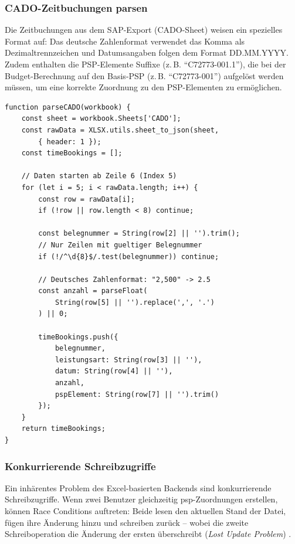 \subsubsection{CADO-Zeitbuchungen parsen}

Die Zeitbuchungen aus dem SAP-Export (CADO-Sheet) weisen ein spezielles Format auf: Das deutsche Zahlenformat verwendet das Komma als Dezimaltrennzeichen und Datumsangaben folgen dem Format DD.MM.YYYY. Zudem enthalten die PSP-Elemente Suffixe (z.\,B. \enquote{C72773-001.1}), die bei der Budget-Berechnung auf den Basis-PSP (z.\,B. \enquote{C72773-001}) aufgelöst werden müssen, um eine korrekte Zuordnung zu den PSP-Elementen zu ermöglichen.

\begin{lstlisting}[caption={Parsing der CADO-Zeitbuchungen}, label={lst:cado-parse}]
function parseCADO(workbook) {
    const sheet = workbook.Sheets['CADO'];
    const rawData = XLSX.utils.sheet_to_json(sheet,
        { header: 1 });
    const timeBookings = [];

    // Daten starten ab Zeile 6 (Index 5)
    for (let i = 5; i < rawData.length; i++) {
        const row = rawData[i];
        if (!row || row.length < 8) continue;

        const belegnummer = String(row[2] || '').trim();
        // Nur Zeilen mit gueltiger Belegnummer
        if (!/^\d{8}$/.test(belegnummer)) continue;

        // Deutsches Zahlenformat: "2,500" -> 2.5
        const anzahl = parseFloat(
            String(row[5] || '').replace(',', '.')
        ) || 0;

        timeBookings.push({
            belegnummer,
            leistungsart: String(row[3] || ''),
            datum: String(row[4] || ''),
            anzahl,
            pspElement: String(row[7] || '').trim()
        });
    }
    return timeBookings;
}
\end{lstlisting}

\subsubsection{Konkurrierende Schreibzugriffe}

Ein inhärentes Problem des Excel-basierten Backends sind konkurrierende Schreibzugriffe. Wenn zwei Benutzer gleichzeitig \gls{psp}-Zuordnungen erstellen, können Race Conditions auftreten: Beide lesen den aktuellen Stand der Datei, fügen ihre Änderung hinzu und schreiben zurück -- wobei die zweite Schreiboperation die Änderung der ersten überschreibt (\textit{Lost Update Problem}) \citep{tanenbaum2017}.

